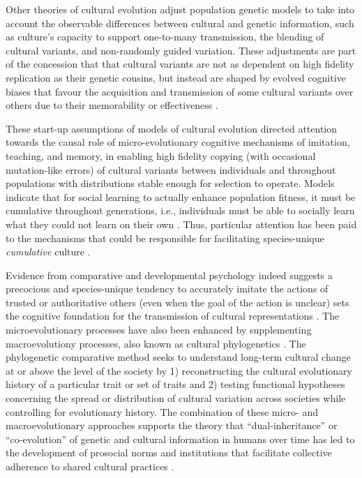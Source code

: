 Other theories of cultural evolution adjust population genetic models to take into account the observable differences between cultural and genetic information, such as culture's capacity to support one-to-many transmission, the blending of cultural variants, and non-randomly guided variation.  These adjustments are part of the concession that that cultural variants are not as dependent on high fidelity replication as their genetic cousins, but instead are shaped by evolved cognitive biases that favour the acquisition and transmission of some cultural variants over others due to their memorability or effectiveness \citep{Henrich2007}.

These start-up assumptions of models of cultural evolution directed attention towards the causal role of micro-evolutionary cognitive mechanisms of imitation, teaching, and memory, in enabling high fidelity copying (with occasional mutation-like errors) of cultural variants between individuals and throughout populations with distributions stable enough for selection to operate.  Models indicate that for social learning to actually enhance population fitness, it must be cumulative throughout generations, i.e., individuals must be able to socially learn what they could not learn on their own \citep{Boyd1995}.  Thus, particular attention has been paid to the mechanisms that could be responsible for facilitating species-unique \textit{cumulative} culture \citep{Tomasello2008}.

Evidence from comparative and developmental psychology indeed suggests a precocious and species-unique tendency to accurately imitate the actions of trusted or authoritative others (even when the goal of the action is unclear) sets the cognitive foundation for the transmission of cultural representations \citep{Tomasello2014a}.  The microevolutionary processes have also been enhanced by supplementing macroevolutiony processes, also known as cultural phylogenetics \citep{Mace1994}.  The phylogenetic comparative method seeks to understand long-term cultural change at or above the level of the society by 1) reconstructing the cultural evolutionary history of a particular trait or set of traits and 2) testing functional hypotheses concerning the spread or distribution of cultural variation across societies while controlling for evolutionary history.  The combination of these micro- and macroevolutionary approaches supports the theory that  ``dual-inheritance'' or ``co-evolution'' of genetic and cultural information in humans over time has led to the development of prosocial norms and institutions that facilitate collective adherence to shared cultural practices \citep{Richerson2008,Chudek2011}.





